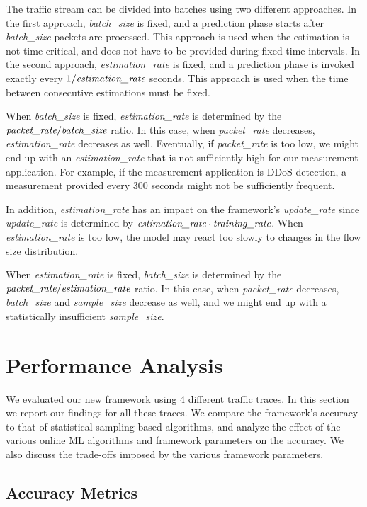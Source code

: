 			The traffic stream can be divided into batches using two different approaches. In the first approach, \emph{batch\_size} is fixed, and a prediction phase starts after \emph{batch\_size} packets are processed. This approach is used when the estimation is not time critical, and does not have to be provided during fixed time intervals. In the second approach, \emph{estimation\_rate} is fixed, and a prediction phase is invoked exactly every $1/\emph{estimation\_rate}$ seconds. This approach is used when the time between consecutive estimations must be fixed.
			
			When \emph{batch\_size} is fixed, \emph{estimation\_rate} is determined by the $\emph{packet\_rate}/\emph{batch\_size}$ ratio. In this case, when \emph{packet\_rate} decreases, \emph{estimation\_rate} decreases as well. Eventually, if \emph{packet\_rate} is too low, we might end up with an \emph{estimation\_rate} that is not sufficiently high for our measurement application. For example, if the measurement application is DDoS detection, a measurement provided every 300 seconds might not be sufficiently frequent.
			
			In addition, \emph{estimation\_rate} has an impact on the framework's \emph{update\_rate} since \emph{update\_rate} is determined by $\emph{estimation\_rate} \cdot \emph{training\_rate}$. When \emph{estimation\_rate} is too low, the model may react too slowly to changes in the flow size distribution.
			
			When \emph{estimation\_rate} is fixed, \emph{batch\_size} is determined by the $\emph{packet\_rate}/\emph{estimation\_rate}$ ratio. In this case, when \emph{packet\_rate} decreases, \emph{batch\_size}  and \emph{sample\_size} decrease as well, and we might end up with a statistically insufficient \emph{sample\_size}.

\section{Performance Analysis} \label{sec:evaluation}

	We evaluated our new framework using 4 different traffic traces. In this section we report our findings for all these traces. We compare the framework's accuracy to that of statistical sampling-based algorithms, and analyze the effect of the various online ML algorithms and framework parameters on the accuracy. We also discuss the trade-offs imposed by the various framework parameters.  
	
	\subsection{Accuracy Metrics} \label{subsec:metrics}

